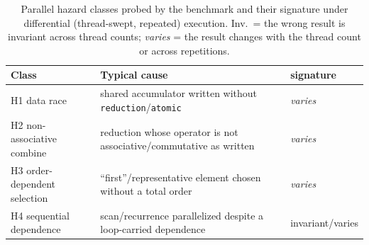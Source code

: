 \begin{table}[t]
\caption{Parallel hazard classes probed by the benchmark and their signature
under differential (thread-swept, repeated) execution. Inv.\ = the wrong result
is invariant across thread counts; \emph{varies} = the result changes with the
thread count or across repetitions.}
\label{tab:hazards}
\centering\footnotesize
\begin{tabular}{@{}p{2.5cm}p{3.1cm}l@{}}
\toprule
Class & Typical cause & signature \\
\midrule
H1 data race        & shared accumulator written without \texttt{reduction}/\texttt{atomic}  & \emph{varies} \\
H2 non-associative combine & reduction whose operator is not associative/commutative as written & \emph{varies} \\
H3 order-dependent selection & ``first''/representative element chosen without a total order & \emph{varies} \\
H4 sequential dependence & scan/recurrence parallelized despite a loop-carried dependence & invariant/varies \\
\bottomrule
\end{tabular}
\end{table}

